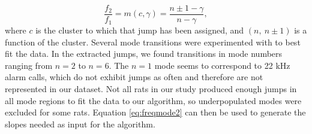 \documentclass[twocolumn, prl]{revtex4}
\begin{document}
\begin{equation}
\label{eq:freqmode2}
\frac{f_{2}}{f_{1}}=m(c,\gamma)=\frac{n\pm1-\gamma}{n-\gamma},
\end{equation}where $c$ is the cluster to which that jump has been assigned, and $\left(n,\: n\pm1\right)$ is a function of the cluster. Several mode transitions were experimented with to best fit the data. In the extracted jumps, we found transitions in mode numbers ranging from $n=2$ to $n=6$. The $n=1$ mode seems to correspond to 22 kHz alarm calls, which do not exhibit jumps as often and therefore are not represented in our dataset. Not all rats in our study produced enough jumps in all mode regions to fit the data to our algorithm, so underpopulated modes were excluded for some rats. Equation \ref{eq:freqmode2} can then be used to generate the slopes needed as input for the algorithm.
\end{document}
